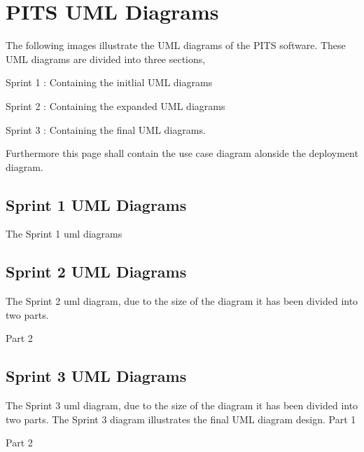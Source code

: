 \hypertarget{page1_sec3}{}\section{P\+I\+T\+S U\+M\+L Diagrams}\label{page1_sec3}
The following images illustrate the U\+ML diagrams of the P\+I\+TS software. These U\+ML diagrams are divided into three sections,
\begin{DoxyItemize}
\item Sprint 1 \+: Containing the initlial U\+ML diagrams
\item Sprint 2 \+: Containing the expanded U\+ML diagrams
\item Sprint 3 \+: Containing the final U\+ML diagrams.
\end{DoxyItemize}

Furthermore this page shall contain the use case diagram alonside the deployment diagram.\hypertarget{Information_subsection1}{}\subsection{Sprint 1 U\+M\+L Diagrams}\label{Information_subsection1}
The Sprint 1 uml diagrams  \hypertarget{Information_subsection2}{}\subsection{Sprint 2 U\+M\+L Diagrams}\label{Information_subsection2}
The Sprint 2 uml diagram, due to the size of the diagram it has been divided into two parts. 

Part 2 \hypertarget{page1_subsection3}{}\subsection{Sprint 3 U\+M\+L Diagrams}\label{page1_subsection3}
The Sprint 3 uml diagram, due to the size of the diagram it has been divided into two parts. The Sprint 3 diagram illustrates the final U\+ML diagram design. Part 1 

Part 2  